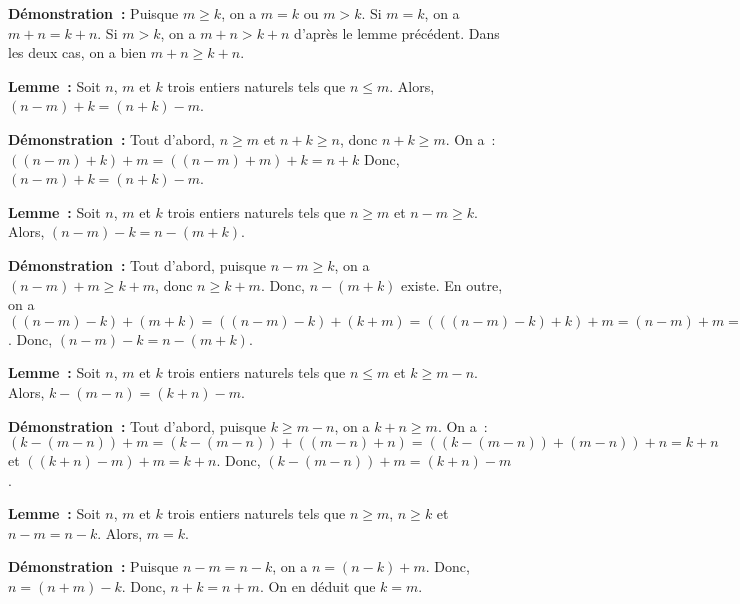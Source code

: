 \noindent\textbf{Démonstration :} 
    Puisque $m \geq k$, on a $m = k$ ou $m > k$.
    Si $m = k$, on a $m + n = k + n$.
    Si $m > k$, on a $m + n > k + n$ d'après le lemme précédent.
    Dans les deux cas, on a bien $m + n \geq k + n$.

   \done 

\medskip

\noindent\textbf{Lemme :} Soit $n$, $m$ et $k$ trois entiers naturels tels que $n \leq m$.
    Alors, $(n-m) + k = (n+k) - m$.

\medskip

\noindent\textbf{Démonstration :} Tout d'abord, $n \geq m$ et $n+k \geq n$, donc $n+k \geq m$.
    On a : $((n-m)+k) + m = ((n-m) + m) + k = n + k$
    Donc, $(n-m)+k = (n+k) - m$.

    \done

\medskip

\noindent\textbf{Lemme :} Soit $n$, $m$ et $k$ trois entiers naturels tels que $n \geq m$ et $n-m \geq k$.
    Alors, $(n-m)-k = n-(m+k)$.

\medskip

\noindent\textbf{Démonstration :} Tout d'abord, puisque $n-m \geq k$, on a $(n-m) + m \geq k+m$, donc $n \geq k+m$.
    Donc, $n-(m+k)$ existe.
    En outre, on a $((n-m)-k) + (m+k) = ((n-m)-k) + (k+m) = (((n-m)-k)+k)+m = (n-m)+m = n$. 
    Donc, $(n-m)-k = n-(m+k)$.

    \done

\medskip

\noindent\textbf{Lemme :} Soit $n$, $m$ et $k$ trois entiers naturels tels que $n \leq m$ et $k \geq m-n$.
    Alors, $k - (m-n) = (k+n) - m$.

\medskip

\noindent\textbf{Démonstration :} Tout d'abord, puisque $k \geq m-n$, on a $k+n \geq m$.
    On a : $(k - (m-n)) + m = (k-(m-n)) + ((m-n) + n) = ((k-(m-n)) + (m-n))+n = k + n$
    et $((k+n)-m) + m = k + n$. 
    Donc, $(k - (m-n)) + m = (k+n) - m$.

   \done 

\medskip

\noindent\textbf{Lemme :} Soit $n$, $m$ et $k$ trois entiers naturels tels que $n \geq m$, $n \geq k$ et $n - m = n - k$.
    Alors, $m = k$.

\medskip

\noindent\textbf{Démonstration :} Puisque $n - m = n - k$, on a $n = (n - k) + m$.
    Donc, $n = (n + m) - k$. 
    Donc, $n + k = n + m$.
    On en déduit que $k = m$.

